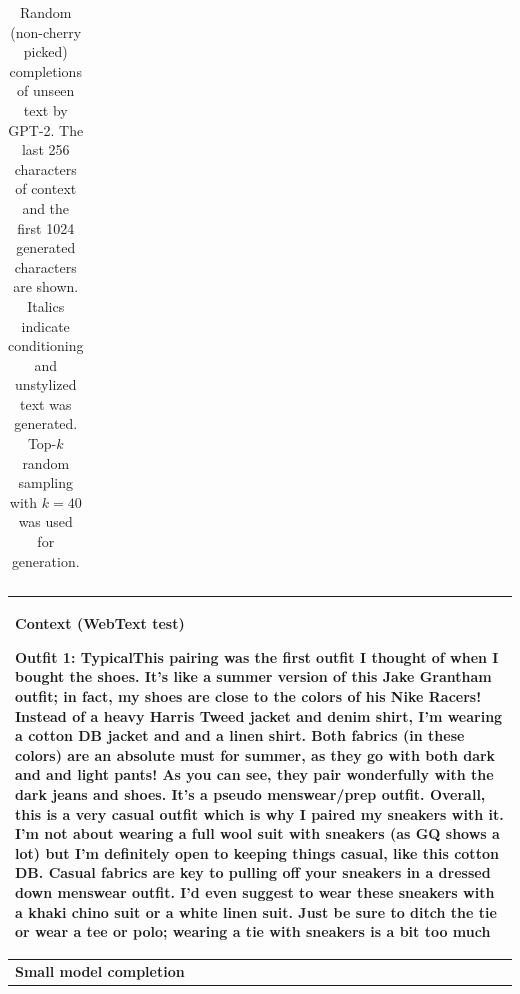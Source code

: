 \documentclass{article}
\begin{document}
\begin{table}[t]
\begin{center}
\begin{tabular}{|p{8cm}|p{8cm}|}
\hline
\end{tabular}
\caption{Random (non-cherry picked) completions of unseen text by GPT-2. The last 256 characters of context and the first 1024 generated characters are shown. Italics indicate conditioning and unstylized text was generated. Top-$k$ random sampling with $k = 40$ was used for generation.}
\label{samples}
\end{center}
\end{table}
\fi

\begin{table}[t]
\begin{center}
\begin{tabular}{|p{8cm}|p{8cm}|}

\hline
\multicolumn{2}{|C{16cm}|}{
\centerline{\textbf{Context (WebText test)}}
Outfit 1: Typical\newline\newline This pairing was the first outfit I thought of when I bought the shoes. It's like a summer version of this Jake Grantham outfit; in fact, my shoes are close to the colors of his Nike Racers! Instead of a heavy Harris Tweed jacket and denim shirt, I'm wearing a cotton DB jacket and and a linen shirt. Both fabrics (in these colors) are an absolute must for summer, as they go with both dark and and light pants! As you can see, they pair wonderfully with the dark jeans and shoes. It's a pseudo menswear/prep outfit. \newline \newline Overall, this is a very casual outfit which is why I paired my sneakers with it. I'm not about wearing a full wool suit with sneakers (as GQ shows a lot) but I'm definitely open to keeping things casual, like this cotton DB. Casual fabrics are key to pulling off your sneakers in a dressed down menswear outfit. I'd even suggest to wear these sneakers with a khaki chino suit or a white linen suit. Just be sure to ditch the tie or wear a tee or polo; wearing a tie with sneakers is a bit too much
} \\
\hline
\centerline{\textbf{Small model completion}}

\end{tabular}
\end{center}
\end{table}
\end{document}
